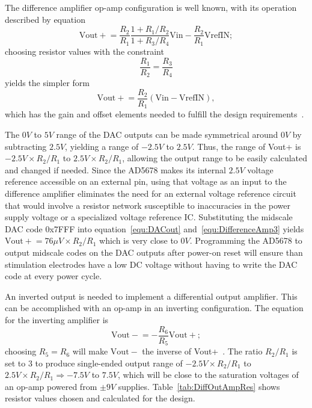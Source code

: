 The difference amplifier op-amp configuration is well known, with its operation described by equation
\begin{equation}
\label{equ:DifferenceAmp1}
\mathrm{Vout+} = \frac{R_2}{R_1} \frac{1 + R_1/R_2}{1 + R_3/R_4} \mathrm{Vin} - \frac{R_2}{R_1} \mathrm{VrefIN};
\end{equation}
choosing resistor values with the constraint
\begin{equation}
\label{equ:DifferenceAmp2}
\frac{R_1}{R_2}  = \frac{R_3}{R_4} 
\end{equation}
yields the simpler form
\begin{equation}
\label{equ:DifferenceAmp3}
\mathrm{Vout+} = \frac{R_2}{R_1} (\mathrm{Vin} - \mathrm{VrefIN}),
\end{equation}
which has the gain and offset elements needed to fulfill the design requirements~\cite{AlexanderSadiku2004}.

The $0\unit{V}$ to $5\unit{V}$ range of the DAC outputs can be made symmetrical around $0\unit{V}$ by subtracting $2.5\unit{V}$, yielding a range of $-2.5\unit{V}$ to $2.5\unit{V}$.  Thus, the range of Vout+ is $-2.5\unit{V}  \times R_2/R_1$ to $2.5\unit{V} \times R_2/R_1$, allowing the output range to be easily calculated and changed if needed.  Since the AD5678 makes its internal $2.5\unit{V}$ voltage reference accessible on an external pin, using that voltage as an input to the difference amplifier eliminates the need for an external voltage reference circuit that would involve a resistor network susceptible to inaccuracies in the power supply voltage or a specialized voltage reference IC.  Substituting the midscale DAC code 0x7FFF into equation~\eqref{equ:DACout} and~\eqref{equ:DifferenceAmp3} yields $\mathrm{Vout+}=76 \unit{\mu V} \times R_2/R_1$ which is very close to $0\unit{V}$.  Programming the AD5678 to output midscale codes on the DAC outputs after power-on reset will ensure than stimulation electrodes have a low DC voltage without having to write the DAC code at every power cycle.

An inverted output is needed to implement a differential output amplifier.  This can be accomplished with an op-amp in an inverting configuration.  The equation for the inverting amplifier is \begin{equation}
\label{equ:InvertingAmp1}
\mathrm{Vout-} = -\frac{R_6}{R_5} \mathrm{Vout+} ;
\end{equation}
choosing $R_5 = R_6$ will make $\mathrm{Vout-}$ the inverse of Vout+~\cite{AlexanderSadiku2004}.  The ratio $R_2/R_1$ is set to $3$ to produce single-ended output range of $-2.5\unit{V}  \times R_2/R_1$ to $2.5\unit{V} \times R_2/R_1  \Rightarrow -7.5\unit{V}$ to $7.5\unit{V}$, which will be close to the saturation voltages of an op-amp powered from $\pm 9\unit{V}$ supplies.  Table~\ref{tab:DiffOutAmpRes} shows resistor values chosen and calculated for the design.

